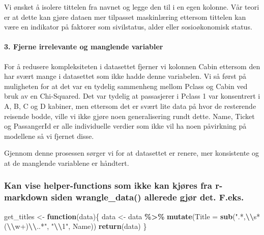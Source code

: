 \documentclass[
]{article}
\newenvironment{Shaded}{\begin{snugshade}}{\end{snugshade}}
\newcommand{\AttributeTok}[1]{\textcolor[rgb]{0.13,0.29,0.53}{#1}}
\newcommand{\ControlFlowTok}[1]{\textcolor[rgb]{0.13,0.29,0.53}{\textbf{#1}}}
\newcommand{\FunctionTok}[1]{\textcolor[rgb]{0.13,0.29,0.53}{\textbf{#1}}}
\newcommand{\NormalTok}[1]{#1}
\newcommand{\OtherTok}[1]{\textcolor[rgb]{0.56,0.35,0.01}{#1}}
\newcommand{\SpecialCharTok}[1]{\textcolor[rgb]{0.81,0.36,0.00}{\textbf{#1}}}
\newcommand{\StringTok}[1]{\textcolor[rgb]{0.31,0.60,0.02}{#1}}
\begin{document}
Vi ønsket å isolere tittelen fra navnet og legge den til i en egen
kolonne. Vår teori er at dette kan gjøre dataen mer tilpasset
maskinlæring ettersom tittelen kan være en indikator på faktorer som
sivilstatus, alder eller sosioøkonomisk status.

\paragraph{3. Fjerne irrelevante og manglende
variabler}\label{fjerne-irrelevante-og-manglende-variabler}

For å redusere kompleksiteten i datasettet fjerner vi kolonnen Cabin
ettersom den har svært mange i datasettet som ikke hadde denne
variabelen. Vi så først på muligheten for at det var en tydelig
sammenheng mellom Pclass og Cabin ved bruk av en Chi-Squared. Det var
tydelig at passasjerer i Pclass 1 var konsentrert i A, B, C og D
kabiner, men ettersom det er svært lite data på hvor de resterende
reisende bodde, ville vi ikke gjøre noen generalisering rundt dette.
Name, Ticket og PassangerId er alle individuelle verdier som ikke vil ha
noen påvirkning på modellene så vi fjernet disse.

Gjennom denne prosessen sørger vi for at datasettet er renere, mer
konsistente og at de manglende variablene er håndtert.

\subsubsection{Kan vise helper-functions som ikke kan kjøres fra
r-markdown siden wrangle\_data() allerede gjør det.
F.eks.}\label{kan-vise-helper-functions-som-ikke-kan-kjuxf8res-fra-r-markdown-siden-wrangle_data-allerede-gjuxf8r-det.-f.eks.}

\begin{Shaded}
\begin{Highlighting}[]
\NormalTok{get\_titles }\OtherTok{\textless{}{-}} \ControlFlowTok{function}\NormalTok{(data)\{}
\NormalTok{  data }\OtherTok{\textless{}{-}}\NormalTok{ data }\SpecialCharTok{\%\textgreater{}\%}
    \FunctionTok{mutate}\NormalTok{(}\AttributeTok{Title =} \FunctionTok{sub}\NormalTok{(}\StringTok{".*,}\SpecialCharTok{\textbackslash{}\textbackslash{}}\StringTok{s*(}\SpecialCharTok{\textbackslash{}\textbackslash{}}\StringTok{w+)}\SpecialCharTok{\textbackslash{}\textbackslash{}}\StringTok{..*"}\NormalTok{, }\StringTok{"}\SpecialCharTok{\textbackslash{}\textbackslash{}}\StringTok{1"}\NormalTok{, Name))}
  \FunctionTok{return}\NormalTok{(data)}
\NormalTok{\}}
\end{Highlighting}
\end{Shaded}
\end{document}
